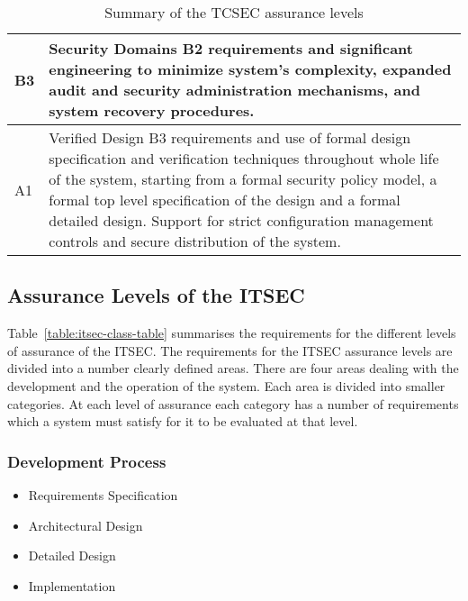 \begin{table}[H]
\begin{center}
\begin{tabular}{|>{\sffamily}p{1cm}|>{\sffamily}p{12cm}|}
            B3 & Security Domains \newline
                    B2 requirements and significant engineering
                    to minimize system's complexity, expanded audit and
                    security administration mechanisms, and system
                    recovery procedures.
                    \\ \hline
            A1 & Verified Design \newline
                    B3 requirements and use of formal design specification and verification
                    techniques throughout whole life of the system,
                    starting from a formal security policy model, a
                    formal top level specification of the design and a
                    formal detailed design. Support for strict
                    configuration management controls and secure
                    distribution of the system.
                    \\ \hline
        \end{tabular}
        \end{center}
    \caption{Summary of the TCSEC assurance levels} \label{table:tcsec-class-table}
    \end{table}

\subsection{Assurance Levels of the ITSEC}
\label{itsec-classes}
    Table~\ref{table:itsec-class-table} summarises the requirements for the different levels of 
    assurance of the ITSEC.
    The requirements for the ITSEC assurance levels are divided into a number clearly
    defined areas.
    There are four areas dealing with the development
    and the operation of the system. Each area is divided into smaller
    categories. At each level of assurance each category has a number of requirements which a system
    must satisfy for it to be evaluated at that level.

    \subsubsection{Development Process}
        \begin{itemize}
            \item Requirements Specification
            \item Architectural Design
            \item Detailed Design
            \item Implementation
        \end{itemize}

